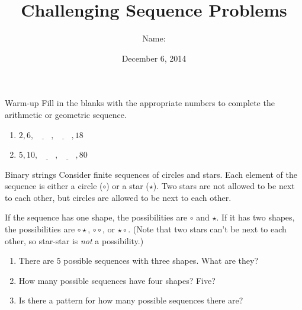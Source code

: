 \documentclass[12pt,letterpaper]{article}
\title{Challenging Sequence Problems}
\author{Name: \underline{\hspace{5cm}}}
\date{December 6, 2014}
\begin{document}
\maketitle

\thispagestyle{empty}

\begin{problem}{Warm-up}
Fill in the blanks with the appropriate numbers to complete the arithmetic or
geometric sequence.

\begin{enumerate}
 \item $2, 6, \underline{\hspace{2em}}, \underline{\hspace{2em}}, 18$
 \item $5, 10, \underline{\hspace{2em}}, \underline{\hspace{2em}}, 80$
\end{enumerate}
\end{problem}

\begin{problem}{Binary strings}
 Consider finite sequences of circles and stars. Each element of the sequence is either a
 circle ($\circ$) or a star ($\star$). Two stars are not allowed to be next to each other, but circles
 are allowed to be next to each other.

 If the sequence has one shape, the possibilities are $\circ$ and $\star$. If it has two shapes, the
 possibilities are $\circ \star$, $\circ \circ$, or $\star \circ$. (Note that two stars can't be next
 to each other, so star-star is \emph{not} a possibility.)

 \begin{enumerate}
  \item There are $5$ possible sequences with three shapes. What are they?
  \item How many possible sequences have four shapes? Five?
  \item Is there a pattern for how many possible sequences there are?
 \end{enumerate}
\end{problem}
\end{document}
